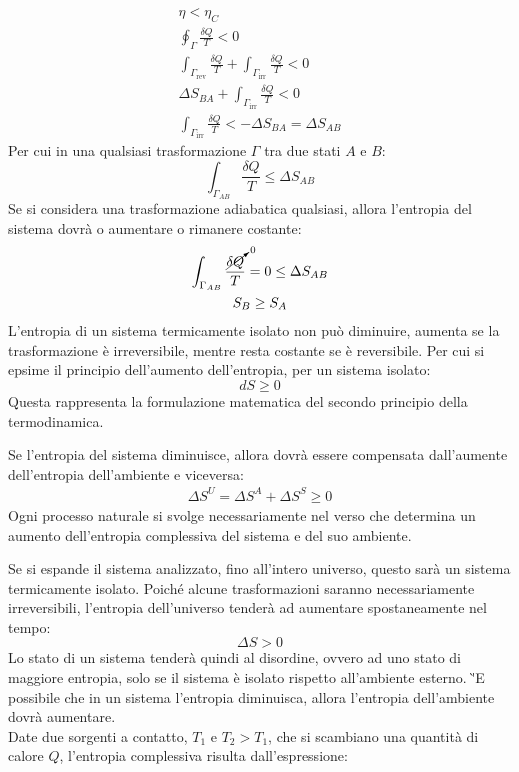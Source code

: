 \documentclass{article}
\numberwithin{equation}{subsection}
\begin{document}
\begin{gather*}
    \eta<\eta_C\\
    \oint_{\Gamma}\displaystyle\frac{\delta Q}{T}<0\\
    \int_{\Gamma_{\mbox{rev}}}\displaystyle\frac{\delta Q}{T}+\int_{\Gamma_{\mbox{irr}}}\frac{\delta Q}{T}<0\\
    \Delta S_{BA}+\displaystyle\int_{\Gamma_{\mbox{irr}}}\frac{\delta Q}{T}<0\\
    \displaystyle\int_{\Gamma_{\mbox{irr}}}\frac{\delta Q}{T}<-\Delta S_{BA}=\Delta S_{AB}
\end{gather*}
Per cui in una qualsiasi trasformazione $\Gamma$ tra due stati $A$ e $B$:
\begin{equation*}
    \displaystyle\int_{\Gamma_{AB}}\frac{\delta Q}{T}\leq\Delta S_{AB}
\end{equation*}
Se si considera una trasformazione adiabatica qualsiasi, allora l'entropia del sistema dovrà o aumentare o rimanere costante:
\begin{gather*}
    \displaystyle\int_{\Gamma_{AB}}\frac{\cancelto{0}{\delta Q}}{T}=0\leq\Delta S_{AB}\\
    S_B\geq S_A
\end{gather*}
L'entropia di un sistema termicamente isolato non può diminuire, aumenta se la trasformazione è irreversibile, mentre resta costante se è reversibile. Per cui 
si epsime il principio dell'aumento dell'entropia, per un sistema isolato: 
\begin{equation*}
    dS\geq0
\end{equation*}
Questa rappresenta la formulazione matematica del secondo principio della termodinamica. 



Se l'entropia del sistema diminuisce, allora dovrà essere compensata dall'aumente dell'entropia dell'ambiente e viceversa:
\begin{gather*}
    \Delta S^U=\Delta  S^A+\Delta S^S\geq0
\end{gather*}
Ogni processo naturale si svolge necessariamente nel verso che determina un aumento dell'entropia complessiva del sistema e del suo ambiente. 



Se si espande il sistema analizzato, fino all'intero universo, questo sarà un sistema termicamente isolato. Poiché alcune trasformazioni saranno necessariamente irreversibili, 
l'entropia dell'universo tenderà ad aumentare spostaneamente nel tempo:
\begin{equation}
    \Delta S>0
\end{equation}
Lo stato di un sistema tenderà quindi al disordine, ovvero ad uno stato di maggiore entropia, solo se il sistema è isolato rispetto all'ambiente esterno. \`'{E} possibile 
che in un sistema l'entropia diminuisca, allora l'entropia dell'ambiente dovrà aumentare. 
\\
Date due sorgenti a contatto, $T_1$ e $T_2>T_1$, che si scambiano una quantità di calore $Q$, l'entropia complessiva risulta dall'espressione:
\end{document}
